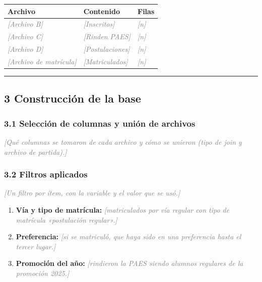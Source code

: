 \documentclass[11pt,letterpaper]{article}
\newcommand{\completar}[1]{\textcolor{gray}{\textit{[#1]}}}
\begin{document}
\begin{center}
\begin{tabular}{>{\raggedright\arraybackslash}p{4.2cm}
                >{\raggedright\arraybackslash}p{5.8cm}
                >{\raggedleft\arraybackslash}p{2.6cm}}
\toprule
\textbf{Archivo} & \textbf{Contenido} & \textbf{Filas} \\
\midrule
\completar{Archivo B} & \completar{Inscritos} & \completar{n} \\
\completar{Archivo C} & \completar{Rinden PAES} & \completar{n} \\
\completar{Archivo D} & \completar{Postulaciones} & \completar{n} \\
\completar{Archivo de matrícula} & \completar{Matriculados} & \completar{n} \\
\bottomrule
\end{tabular}
\end{center}

\medskip\hrule\medskip

\subsection*{3 \; Construcción de la base}

\subsubsection*{3.1 \; Selección de columnas y unión de archivos}

\completar{Qué columnas se tomaron de cada archivo y cómo se unieron
(tipo de \emph{join} y archivo de partida).}

\subsubsection*{3.2 \; Filtros aplicados}

\completar{Un filtro por ítem, con la variable y el valor que se usó.}

\begin{enumerate}[leftmargin=1.5em, itemsep=0.3em, label=\textbf{\alph*)}]
  \item \textbf{Vía y tipo de matrícula:} \completar{matriculados por vía
        regular con tipo de matrícula «postulación regular».}
  \item \textbf{Preferencia:} \completar{si se matriculó, que haya sido en
        una preferencia hasta el tercer lugar.}
  \item \textbf{Promoción del año:} \completar{rindieron la PAES siendo
        alumnos regulares de la promoción 2025.}
\end{enumerate}
\end{document}
